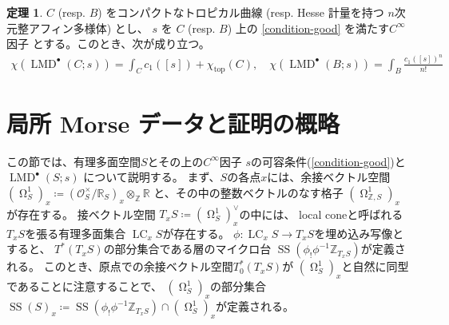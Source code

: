\documentclass[uplatex,dvipdfmx,12pt]{jsarticle}
\numberwithin{equation}{section}
\theoremstyle{definition}
\newtheorem{theorem}{定理}[section]
\newcommand{\deq}{\coloneqq}
\newcommand{\opn}[1]{\operatorname{#1}}
\newcommand{\beforesection}{\vspace{-15pt}}
\newcommand{\aftersection}{\vspace{-8pt}}
\DeclareMathOperator{\tform}{\Omega}
\begin{document}
\begin{theorem} \label{theorem-main}
$C$ (resp. $B$) をコンパクトなトロピカル曲線 (resp. Hesse 計量を持つ
$n$次元整アフィン多様体) とし、
$s$ を $C$ (resp. $B$) 上の
\cref{condition-good} を満たす$C^{\infty}$因子 
とする。このとき、次が成り立つ。
\begin{align}
\chi(\opn{LMD}^{\bullet}(C;s))=\int_C c_1([s])+
\chi_{\opn{top}}(C), \quad
\chi(\opn{LMD}^{\bullet}(B;s))=\int_B \frac{c_1([s])^n}{n!}
\end{align}
\end{theorem}

\beforesection

\section{局所 Morse データと証明の概略}

\aftersection

この節では、有理多面空間$S$とその上の$C^{\infty}$因子
$s$の可容条件(\cref{condition-good})と 
$\opn{LMD}^{\bullet}(S;s)$ について説明する。
まず、$S$の各点$x$には、余接ベクトル空間
$(\tform^{1}_{S})_x\deq
(\mathcal{O}_S^{\times}/\mathbb{R}_S)_x
\otimes_{\mathbb{Z}}\mathbb{R}$
と、その中の整数ベクトルのなす格子
$(\tform^{1}_{\mathbb{Z},S})_x$が存在する。
接ベクトル空間
$T_x S\deq(\tform^{1}_{S})_x^{\vee}$の中には、
local coneと呼ばれる
$T_xS$を張る有理多面集合
$\opn{LC}_x S$が存在する。
$\phi \colon \opn{LC}_x S\to T_x S$を埋め込み写像とすると、
$T^{*}(T_xS)$の部分集合である層のマイクロ台
$\opn{SS}(\phi_!\phi^{-1}\mathbb{Z}_{T_xS})$が定義される。
このとき、原点での余接ベクトル空間$T^{*}_0(T_xS)$が
$(\tform_S^{1})_x$と自然に同型であることに注意することで、
$(\tform_S^{1})_x$の部分集合
$\opn{SS}(S)_x\deq \opn{SS}(\phi_!\phi^{-1}\mathbb{Z}_{T_xS})
\cap (\tform_S^{1})_x$が定義される。
\end{document}
